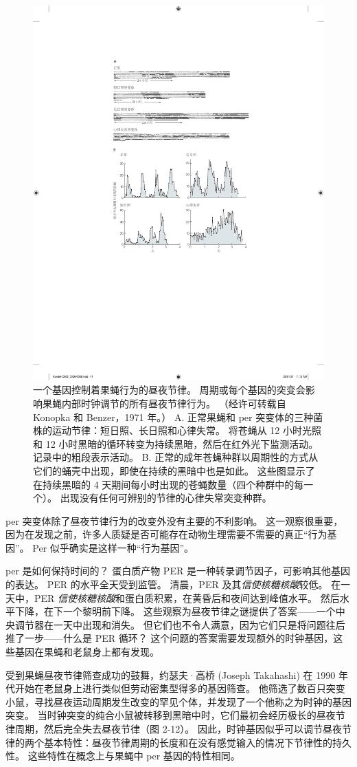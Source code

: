 \begin{figure}[htbp]
	\centering
	\includegraphics[width=0.5\linewidth]{chap02/fig_2_11}
	\caption{一个基因控制着果蝇行为的昼夜节律。 周期或每个基因的突变会影响果蝇内部时钟调节的所有昼夜节律行为。 
		（经许可转载自 Konopka 和 Benzer，1971 年。）
		A. 正常果蝇和 per 突变体的三种菌株的运动节律：短日照、长日照和心律失常。 将苍蝇从 12 小时光照和 12 小时黑暗的循环转变为持续黑暗，然后在红外光下监测活动。 记录中的粗段表示活动。 
		B. 正常的成年苍蝇种群以周期性的方式从它们的蛹壳中出现，即使在持续的黑暗中也是如此。 这些图显示了在持续黑暗的 4 天期间每小时出现的苍蝇数量（四个种群中的每一个）。
		出现没有任何可辨别的节律的心律失常突变种群。}
	\label{fig:2_11}
\end{figure}


per 突变体除了昼夜节律行为的改变外没有主要的不利影响。 
这一观察很重要，因为在发现之前，许多人质疑是否可能存在动物生理需要不需要的真正“行为基因”。 
Per 似乎确实是这样一种“行为基因”。


per 是如何保持时间的？ 
蛋白质产物 PER 是一种转录调节因子，可影响其他基因的表达。 
PER 的水平全天受到监管。 
清晨，PER 及其\textit{信使核糖核酸}较低。 
在一天中，PER \textit{信使核糖核酸}和蛋白质积累，在黄昏后和夜间达到峰值水平。 
然后水平下降，在下一个黎明前下降。 
这些观察为昼夜节律之谜提供了答案——一个中央调节器在一天中出现和消失。 
但它们也不令人满意，因为它们只是将问题往后推了一步——什么是 PER 循环？ 
这个问题的答案需要发现额外的时钟基因，这些基因在果蝇和老鼠身上都有发现。


受到果蝇昼夜节律筛查成功的鼓舞，约瑟夫·高桥 (Joseph Takahashi) 在 1990 年代开始在老鼠身上进行类似但劳动密集型得多的基因筛查。 
他筛选了数百只突变小鼠，寻找昼夜运动周期发生改变的罕见个体，并发现了一个他称之为时钟的基因突变。 
当时钟突变的纯合小鼠被转移到黑暗中时，它们最初会经历极长的昼夜节律周期，然后完全失去昼夜节律（图 2-12）。 
因此，时钟基因似乎可以调节昼夜节律的两个基本特性：昼夜节律周期的长度和在没有感觉输入的情况下节律性的持久性。 
这些特性在概念上与果蝇中 per 基因的特性相同。


